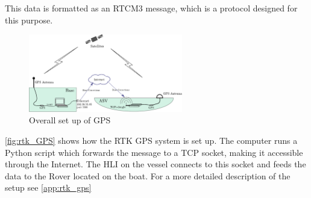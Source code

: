 This data is formatted as an RTCM3 message, which is a protocol designed for this purpose.
\begin{figure}[H]
	\includegraphics[width=0.6\textwidth]{figures/comunicationSetup.pdf}
	\caption{Overall set up of GPS}
	\label{fig:rtk_GPS}
\end{figure}
\autoref{fig:rtk_GPS} shows how the RTK GPS system is set up. 
The computer runs a Python script which forwards the message to a TCP socket, making it accessible through the Internet. 
The HLI on the vessel connects to this socket and feeds the data to the Rover located on the boat.
For a more detailed description of the setup see \autoref{app:rtk_gps}
